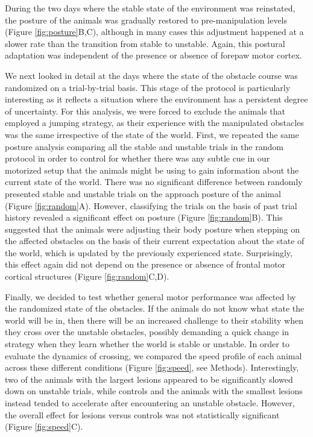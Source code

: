 During the two days where the stable state of the environment was reinstated, the posture of the animals was gradually restored to pre-manipulation levels (Figure \ref{fig:posture}B,C), although in many cases this adjustment happened at a slower rate than the transition from stable to unstable. Again, this postural adaptation was independent of the presence or absence of forepaw motor cortex.

We next looked in detail at the days where the state of the obstacle course was randomized on a trial-by-trial basis. This stage of the protocol is particularly interesting as it reflects a situation where the environment has a persistent degree of uncertainty. For this analysis, we were forced to exclude the animals that employed a jumping strategy, as their experience with the manipulated obstacles was the same irrespective of the state of the world. First, we repeated the same posture analysis comparing all the stable and unstable trials in the random protocol in order to control for whether there was any subtle cue in our motorized setup that the animals might be using to gain information about the current state of the world. There was no significant difference between randomly presented stable and unstable trials on the approach posture of the animal (Figure \ref{fig:random}A). However, classifying the trials on the basis of past trial history revealed a significant effect on posture (Figure \ref{fig:random}B). This suggested that the animals were adjusting their body posture when stepping on the affected obstacles on the basis of their current expectation about the state of the world, which is updated by the previously experienced state. Surprisingly, this effect again did not depend on the presence or absence of frontal motor cortical structures (Figure \ref{fig:random}C,D).

Finally, we decided to test whether general motor performance was affected by the randomized state of the obstacles. If the animals do not know what state the world will be in, then there will be an increased challenge to their stability when they cross over the unstable obstacles, possibly demanding a quick change in strategy when they learn whether the world is stable or unstable. In order to evaluate the dynamics of crossing, we compared the speed profile of each animal across these different conditions (Figure \ref{fig:speed}, see Methods). Interestingly, two of the animals with the largest lesions appeared to be significantly slowed down on unstable trials, while controls and the animals with the smallest lesions instead tended to accelerate after encountering an unstable obstacle. However, the overall effect for lesions versus controls was not statistically significant (Figure \ref{fig:speed}C).

